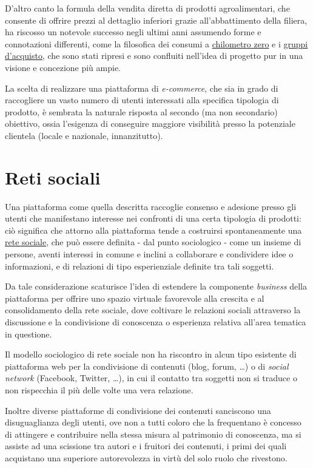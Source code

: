 \documentclass[11pt,a4paper,headsepline,hidelinks]{scrreprt} %
\begin{document}
	D'altro canto la formula della vendita diretta di prodotti agroalimentari, che consente di offrire prezzi al dettaglio inferiori grazie all'abbattimento della filiera, ha riscosso un notevole successo negli ultimi anni assumendo forme e connotazioni differenti, come la filosofica dei consumi a \underline{chilometro zero} e i \underline{gruppi d'acquisto}, che sono stati ripresi e sono confluiti nell'idea di progetto pur in una visione e concezione più ampie.

	La scelta di realizzare una piattaforma di \textit{e-commerce}, che sia in grado di raccogliere un vasto numero di utenti interessati alla specifica tipologia di prodotto, è sembrata la naturale risposta al secondo (ma non secondario) obiettivo, ossia l'esigenza di conseguire maggiore visibilità presso la potenziale clientela (locale e nazionale, innanzitutto).

	\section{Reti sociali}
	\label{sec:progetto:reti-sociali}
	Una piattaforma come quella descritta raccoglie consenso e adesione presso gli utenti che manifestano interesse nei confronti di una certa tipologia di prodotti: ciò significa che attorno alla piattaforma tende a costruirsi spontaneamente una \underline{rete sociale}, che può essere definita - dal punto sociologico - come un insieme di persone, aventi interessi in comune e inclini a collaborare e condividere idee o informazioni, e di relazioni di tipo esperienziale definite tra tali soggetti.

	Da tale considerazione scaturisce l'idea di estendere la componente \textit{business} della piattaforma per offrire uno spazio virtuale favorevole alla crescita e al consolidamento della rete sociale, dove coltivare le relazioni sociali attraverso la discussione e la condivisione di conoscenza o esperienza relativa all'area tematica in questione.

	Il modello sociologico di rete sociale non ha riscontro in alcun tipo esistente di piattaforma web per la condivisione di contenuti (blog, forum, \ldots) o di \textit{social network} (Facebook, Twitter, \ldots), in cui il contatto tra soggetti non si traduce o non rispecchia il più delle volte una vera relazione.

	Inoltre diverse piattaforme di condivisione dei contenuti sanciscono una disuguaglianza degli utenti, ove non a tutti coloro che la frequentano è concesso di attingere e contribuire nella stessa misura al patrimonio di conoscenza, ma si assiste ad una scissione tra autori e i fruitori dei contenuti, i primi dei quali acquistano una superiore autorevolezza in virtù del solo ruolo che rivestono.
\end{document}
